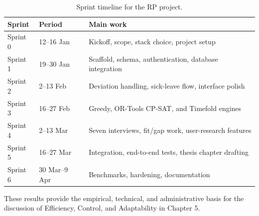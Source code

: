 \begin{table}[h]
\centering
\caption{Sprint timeline for the RP project.}
\label{tab:sprint-timeline}
\small
\begin{tabularx}{\textwidth}{@{}
  p{}
  p{}
  X
@{}}
\toprule
\textbf{Sprint} & \textbf{Period} & \textbf{Main work} \\
\midrule
Sprint 0 & 12--16 Jan & Kickoff, scope, stack choice, project setup \\
Sprint 1 & 19--30 Jan & Scaffold, schema, authentication, database integration \\
Sprint 2 & 2--13 Feb & Deviation handling, sick-leave flow, interface polish \\
Sprint 3 & 16--27 Feb & Greedy, OR-Tools CP-SAT, and Timefold engines \\
Sprint 4 & 2--13 Mar & Seven interviews, fit/gap work, user-research features \\
Sprint 5 & 16--27 Mar & Integration, end-to-end tests, thesis chapter drafting \\
Sprint 6 & 30 Mar--9 Apr & Benchmarks, hardening, documentation \\
\bottomrule
\end{tabularx}
\end{table}

These results provide the empirical, technical, and administrative basis for the discussion of Efficiency, Control, and Adaptability in Chapter 5.

